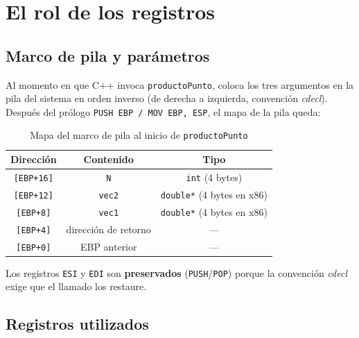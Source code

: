 \documentclass[12pt, letterpaper]{article}
\begin{document}
\section{El rol de los registros}

\subsection{Marco de pila y parámetros}

Al momento en que C++ invoca \texttt{productoPunto}, coloca los tres argumentos en la pila del sistema en orden inverso (de derecha a izquierda, convención \textit{cdecl}). Después del prólogo \texttt{PUSH EBP / MOV EBP, ESP}, el mapa de la pila queda:

\begin{table}[H]
    \centering
    \begin{tabular}{@{}ccc@{}}
        \toprule
        \textbf{Dirección} & \textbf{Contenido} & \textbf{Tipo} \\
        \midrule
        \texttt{[EBP+16]} & \texttt{N}     & \texttt{int} (4 bytes) \\
        \texttt{[EBP+12]} & \texttt{vec2}  & \texttt{double*} (4 bytes en x86) \\
        \texttt{[EBP+8]}  & \texttt{vec1}  & \texttt{double*} (4 bytes en x86) \\
        \texttt{[EBP+4]}  & dirección de retorno & — \\
        \texttt{[EBP+0]}  & EBP anterior   & — \\
        \bottomrule
    \end{tabular}
    \caption{Mapa del marco de pila al inicio de \texttt{productoPunto}}
\end{table}

Los registros \texttt{ESI} y \texttt{EDI} son \textbf{preservados} (\texttt{PUSH}/\texttt{POP}) porque la convención \textit{cdecl} exige que el llamado los restaure.

\subsection{Registros utilizados}
\end{document}
